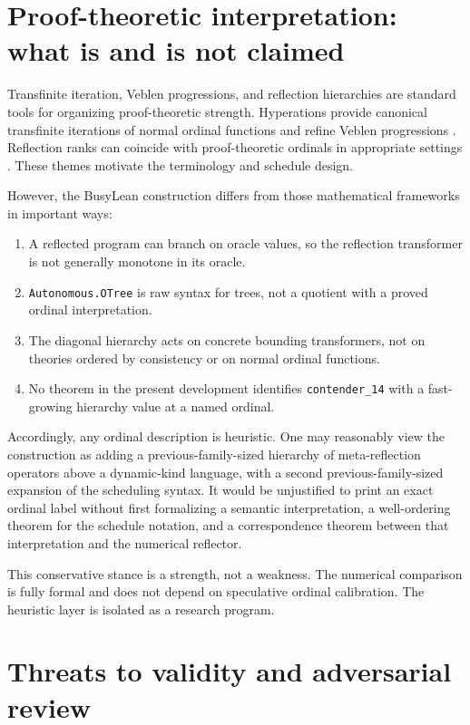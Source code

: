 \documentclass[11pt]{article}
\theoremstyle{definition}
\newcommand{\code}[1]{\texttt{#1}}
\begin{document}
\section{Proof-theoretic interpretation: what is and is not claimed}

Transfinite iteration, Veblen progressions, and reflection hierarchies are standard tools for organizing proof-theoretic strength.  Hyperations provide canonical transfinite iterations of normal ordinal functions and refine Veblen progressions \cite{fernandezduque-joosten}.  Reflection ranks can coincide with proof-theoretic ordinals in appropriate settings \cite{pakhomov-walsh}.  These themes motivate the terminology and schedule design.

However, the BusyLean construction differs from those mathematical frameworks in important ways:
\begin{enumerate}
\item A reflected program can branch on oracle values, so the reflection transformer is not generally monotone in its oracle.
\item \code{Autonomous.OTree} is raw syntax for trees, not a quotient with a proved ordinal interpretation.
\item The diagonal hierarchy acts on concrete bounding transformers, not on theories ordered by consistency or on normal ordinal functions.
\item No theorem in the present development identifies \code{contender\_14} with a fast-growing hierarchy value at a named ordinal.
\end{enumerate}

Accordingly, any ordinal description is heuristic.  One may reasonably view the construction as adding a previous-family-sized hierarchy of meta-reflection operators above a dynamic-kind language, with a second previous-family-sized expansion of the scheduling syntax.  It would be unjustified to print an exact ordinal label without first formalizing a semantic interpretation, a well-ordering theorem for the schedule notation, and a correspondence theorem between that interpretation and the numerical reflector.

This conservative stance is a strength, not a weakness.  The numerical comparison is fully formal and does not depend on speculative ordinal calibration.  The heuristic layer is isolated as a research program.

\section{Threats to validity and adversarial review}
\end{document}
